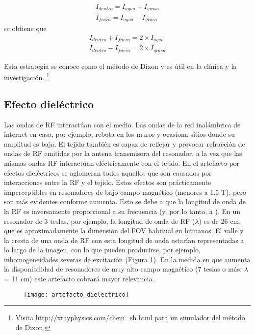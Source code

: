 \begin{equation*}
 \begin{aligned}
I_{dentro} = I_{agua} + I_{grasa} \\
I_{fuera} = I_{agua} - I_{grasa}
  \end{aligned}
\end{equation*}
se obtiene que
\begin{equation*}
 \begin{aligned}
I_{dentro} + I_{fuera} = 2 \times I_{agua} \\
I_{dentro} - I_{fuera} = 2 \times I_{grasa}
 \end{aligned}
\end{equation*}

Esta estrategia se conoce como el método de Dixon \cite{dixon1984} y es útil en la clínica y la investigación. \footnote{Visita \url{http://xrayphysics.com/chem_sh.html} para un simulador del método de Dixon.}



\subsection{Efecto dieléctrico}
Las ondas de RF interactúan con el medio. Las ondas de la red inalámbrica de internet en casa, por ejemplo, rebota en los muros y ocasiona sitios donde su amplitud es baja. El tejido también es capaz de reflejar y provocar refracción de ondas de RF emitidas por la antena transmisora del resonador, a la vez que las mismas ondas RF interactúan eléctricamente con el tejido. En el artefacto por efectos dieléctricos se aglomeran todos aquellos que son causados por interacciones entre la RF y el tejido. Estos efectos son prácticamente imperceptibles en resonadores de bajo campo magnético (menores a 1.5 T), pero son más evidentes conforme \Bzero aumenta. Esto se debe a que la longitud de onda de la RF es inversamente proporcional a su frecuencia (y, por lo tanto, a \Bzero). En un resonador de 3 teslas, por ejemplo, la longitud de onda de RF ($\lambda$) es de 26 cm, que es aproximadamente la dimensión del FOV habitual en humanos. El valle y la cresta de una onda de RF con esta longitud de onda estarían representadas a lo largo de la imagen, con lo que pueden producirse, por ejemplo, inhomogeneidades severas de excitación (Figura \ref{fig:artefacto_dielectrico}). En la medida en que aumenta la disponibilidad de resonadores de muy alto campo magnético (7 teslas o más; $\lambda$ = 11 cm) este artefacto cobrará mayor relevancia. 


\begin{figure}[htb]
 \begin{figg}
   \texttt{[image: artefacto\_dielectrico]}
   \caption{\figurapendiente}
 \label{fig:artefacto_dielectrico}
 \end{figg}
\end{figure}

